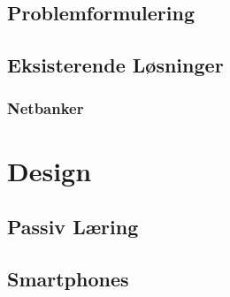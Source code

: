 \section{Problemformulering}


\section{Eksisterende Løsninger}
\subsection{Netbanker}


%

\chapter{Design}

\section{Passiv Læring}


\section{Smartphones}





